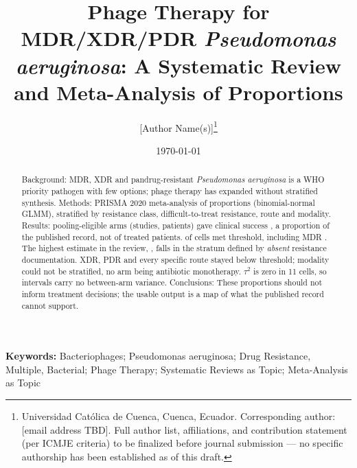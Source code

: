 \documentclass[12pt]{article}
\title{Phage Therapy for MDR/XDR/PDR \textit{Pseudomonas aeruginosa}: A Systematic Review and Meta-Analysis of Proportions}
\author{%
[Author Name(s)]\thanks{Universidad Cat\'olica de Cuenca, Cuenca, Ecuador. Corresponding author: [email address TBD]. Full author list, affiliations, and contribution statement (per ICMJE criteria) to be finalized before journal submission --- no specific authorship has been established as of this draft.}%
}
\date{\today}
\begin{document}
\maketitle
\thispagestyle{empty}

\begin{abstract}
\noindent \singlespacing
Background: MDR, XDR and pandrug-resistant \textit{Pseudomonas aeruginosa} is a WHO priority pathogen with few options; phage therapy has expanded without stratified synthesis. Methods: PRISMA 2020 meta-analysis of proportions (binomial-normal GLMM), stratified by resistance class, difficult-to-treat resistance, route and modality. Results: \PrismaPooledArms pooling-eligible arms (\PrismaPooledStudies studies, \PatientsAnalysed patients) gave clinical success \CsOverallEstCI, a proportion of the published record, not of treated patients. \CellsPooled of \CellsTotal cells met threshold, including MDR \CsResMDREstCI. The highest estimate in the review, \CsResNotClassifiableEst, falls in the stratum defined by \emph{absent} resistance documentation. XDR, PDR and every specific route stayed below threshold; modality could not be stratified, no arm being antibiotic monotherapy. $\tau^2$ is zero in 11 cells, so intervals carry no between-arm variance. Conclusions: These proportions should not inform treatment decisions; the usable output is a map of what the published record cannot support.
\end{abstract}

\vspace{1em}
\noindent \textbf{Keywords:} Bacteriophages; Pseudomonas aeruginosa; Drug Resistance, Multiple, Bacterial; Phage Therapy; Systematic Reviews as Topic; Meta-Analysis as Topic

\newpage
\setcounter{page}{1}









\clearpage
\small
\printbibliography
\end{document}
